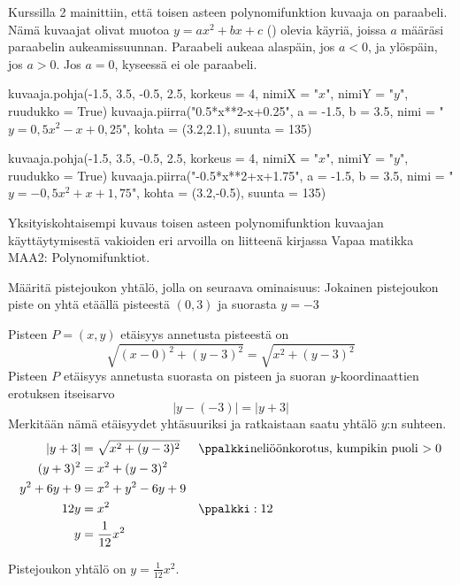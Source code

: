 

Kurssilla 2 mainittiin, että toisen asteen polynomifunktion kuvaaja on paraabeli. Nämä kuvaajat olivat muotoa $y=ax^2+bx+c$ () olevia käyriä, joissa $a$ määräsi paraabelin aukeamissuunnan. Paraabeli aukeaa alaspäin, jos $a<0$, ja ylöspäin, jos $a>0$. Jos $a=0$, kyseessä ei ole paraabeli.

\begin{kuva}
    kuvaaja.pohja(-1.5, 3.5, -0.5, 2.5, korkeus = 4, nimiX = "$x$", nimiY = "$y$", ruudukko = True)
    kuvaaja.piirra("0.5*x**2-x+0.25", a = -1.5, b = 3.5, nimi = "$y= 0,5x^2-x+0,25$", kohta = (3.2,2.1), suunta = 135)
\end{kuva}

\begin{kuva}
    kuvaaja.pohja(-1.5, 3.5, -0.5, 2.5, korkeus = 4, nimiX = "$x$", nimiY = "$y$", ruudukko = True)
    kuvaaja.piirra("-0.5*x**2+x+1.75", a = -1.5, b = 3.5, nimi = "$y= -0,5x^2+x+1,75$", kohta = (3.2,-0.5), suunta = 135)
\end{kuva}

Yksityiskohtaisempi kuvaus toisen asteen polynomifunktion kuvaajan käyttäytymisestä vakioiden eri arvoilla on liitteenä kirjassa Vapaa matikka MAA2: Polynomifunktiot.

\begin{esimerkki}
Määritä pistejoukon yhtälö, jolla on seuraava ominaisuus: Jokainen pistejoukon piste on yhtä etäällä pisteestä $(0, 3)$ ja suorasta $y=-3$
\begin{esimratk}
Pisteen $P=(x, y)$ etäisyys annetusta pisteestä on
\[
\sqrt{(x-0)^2+(y-3)^2}=\sqrt{x^2+(y-3)^2}
\]
Pisteen $P$ etäisyys annetusta suorasta on pisteen ja suoran $y$-koordinaattien erotuksen itseisarvo
\[
|y-(-3)| = |y+3| 
\]
Merkitään nämä etäisyydet yhtäsuuriksi ja ratkaistaan saatu yhtälö $y$:n suhteen.
\begin{align*}
|y+3| & = \sqrt{x^2+(y-3)^2} &&\ppalkki \text{neliöönkorotus, kumpikin puoli $>0$}\\
(y+3)^2  &= x^2+(y-3)^2 \\
y^2+6y+9 &=  x^2+y^2-6y+9\\
12y &= x^2 &&\ppalkki : 12\\
y &= \frac{1}{12}x^2
\end{align*}

Pistejoukon yhtälö on $y=\frac{1}{12}x^2$.

\end{esimratk}
\end{esimerkki}


